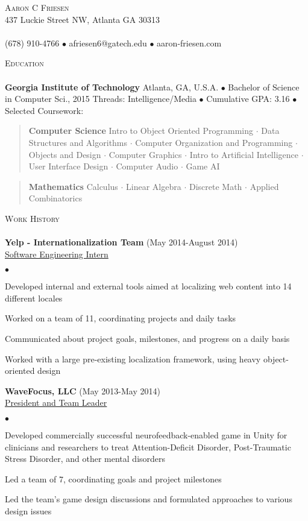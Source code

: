 \documentclass{article}
\newcommand{\area}[2]{\vspace*{-9pt} \begin{verse}\textbf{#1}   #2 \end{verse}  }
\newcommand{\lineunder}{\vspace*{-8pt} \\ \hspace*{-18pt} \hrulefill \\}
\newcommand{\header}[1]{{\hspace*{-15pt}\vspace*{6pt} \textsc{#1}} \vspace*{-6pt} \lineunder}
\newcommand{\employer}[3]{{ \textbf{#1} (#2)\\ \underline{{{#3}}}\\  }}
\newcommand{\contact}[3]{
\vspace*{-8pt}
\begin{center}
{\LARGE \scshape {#1}}\\
#2 \lineunder 
#3
\end{center}
\vspace*{-8pt}
}
\newenvironment{achievements}{\begin{list}{$\bullet$}{\topsep 0pt \itemsep -2pt}}{\vspace*{4pt}\end{list}}
\newcommand{\schoolwithcourses}[4]{
 \textbf{#1} #2 $\bullet$ #3 $\bullet$ 
#4 $\bullet$  Selected Coursework:\\
\vspace*{5pt}
}
\begin{document}
\smallskip
\vspace*{0pt}

\contact{Aaron C Friesen}
{437 Luckie Street NW, Atlanta GA 30313}
{(678) 910-4766 $\bullet$ afriesen6@gatech.edu $\bullet$ aaron-friesen.com}

\vspace*{18pt}
\header{Education}

\schoolwithcourses{Georgia Institute of Technology}{Atlanta, GA, U.S.A.}{Bachelor of Science in Computer Sci., 2015 Threads: Intelligence/Media}
{Cumulative GPA: 3.16}
	\area{Computer Science}{ Intro to Object Oriented Programming $\cdot$ Data Structures and Algorithms $\cdot$ Computer Organization and Programming $\cdot$ Objects and Design $\cdot$ Computer Graphics $\cdot$ Intro to Artificial Intelligence $\cdot$ User Interface Design $\cdot$ Computer Audio $\cdot$ Game AI}
	\area{Mathematics}{Calculus $\cdot$ Linear Algebra $\cdot$ Discrete Math $\cdot$ Applied Combinatorics}

\vspace*{18pt}
\header{Work History}

\employer{Yelp - Internationalization Team}{May 2014-August 2014}{Software Engineering Intern}
    \begin{achievements}
    \item Developed internal and external tools aimed at localizing web content into 14 different locales
    \item Worked on a team of 11, coordinating projects and daily tasks
    \item Communicated about project goals, milestones, and progress on a daily basis
    \item Worked with a large pre-existing localization framework, using heavy object-oriented design
    \end{achievements}

\employer{WaveFocus, LLC}{May 2013-May 2014}{President and Team Leader}
	\begin{achievements}
	\item Developed commercially successful neurofeedback-enabled game in Unity for clinicians and researchers to treat Attention-Deficit Disorder, Post-Traumatic Stress Disorder, and other mental disorders
    \item Led a team of 7, coordinating goals and project milestones
    \item Led the team's game design discussions and formulated approaches to various design issues
	\end{achievements}
\end{document}
